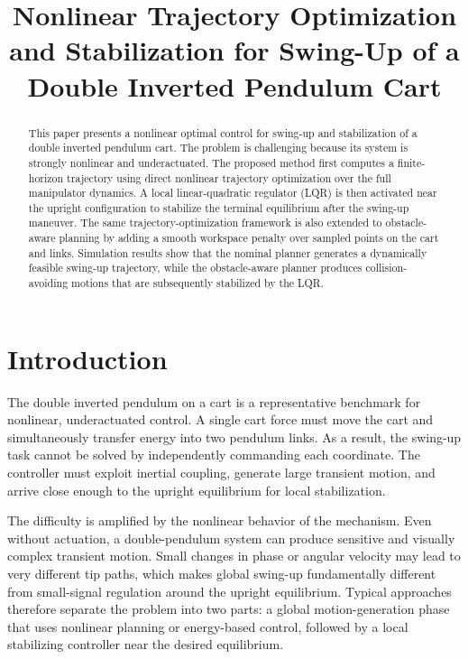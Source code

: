 \documentclass[conference]{IEEEtran}
\title{
Nonlinear Trajectory Optimization and Stabilization for Swing-Up of a Double Inverted Pendulum Cart
}
\author{
\IEEEauthorblockN{JunYoung Kim}
\IEEEauthorblockA{Department of Mechanical and Aerospace Engineering\\
MAE589: Advanced Robotics Course Project Report}
}
\begin{document}
\maketitle
\thispagestyle{empty}
\pagestyle{empty}

\begin{abstract}
This paper presents a nonlinear optimal control for swing-up and stabilization of a double inverted pendulum cart. The problem is challenging because its system is strongly nonlinear and underactuated. The proposed method first computes a finite-horizon trajectory using direct nonlinear trajectory optimization over the full manipulator dynamics. A local linear-quadratic regulator (LQR) is then activated near the upright configuration to stabilize the terminal equilibrium after the swing-up maneuver. The same trajectory-optimization framework is also extended to obstacle-aware planning by adding a smooth workspace penalty over sampled points on the cart and links. Simulation results show that the nominal planner generates a dynamically feasible swing-up trajectory, while the obstacle-aware planner produces collision-avoiding motions that are subsequently stabilized by the LQR.
\end{abstract}

\section{Introduction}
The double inverted pendulum on a cart is a representative benchmark for nonlinear, underactuated control. A single cart force must move the cart and simultaneously transfer energy into two pendulum links. As a result, the swing-up task cannot be solved by independently commanding each coordinate. The controller must exploit inertial coupling, generate large transient motion, and arrive close enough to the upright equilibrium for local stabilization.

The difficulty is amplified by the nonlinear behavior of the mechanism. Even without actuation, a double-pendulum system can produce sensitive and visually complex transient motion. Small changes in phase or angular velocity may lead to very different tip paths, which makes global swing-up fundamentally different from small-signal regulation around the upright equilibrium. Typical approaches therefore separate the problem into two parts: a global motion-generation phase that uses nonlinear planning or energy-based control, followed by a local stabilizing controller near the desired equilibrium.
\end{document}
